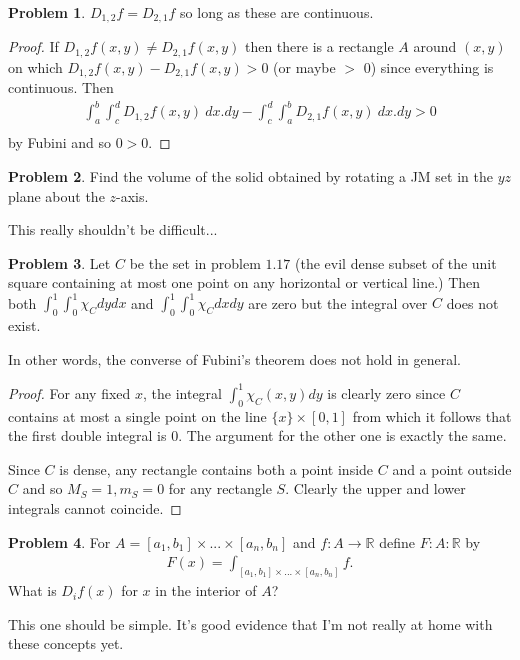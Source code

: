 \documentclass[20pt]{article}
\theoremstyle{plain}
\theoremstyle{definition}
\newtheorem*{problem}{Problem}
\newcommand{\reals}{\mathbb{R}}
\begin{document}
\begin{problem}{3.28}
  $D_{1, 2}f = D_{2, 1}f$ so long as these are continuous.
\end{problem}
\begin{proof}
	If $D_{1, 2}f(x, y) \neq D_{2, 1}f(x, y)$ then there is a rectangle 
	$A$ around $(x, y)$ on which $D_{1, 2}f(x, y) - D_{2, 1}f(x, y) > 0$ (or maybe $>$ 0)
	since everything is continuous.  Then 
	\begin{align*}
		\int_a^b \int_c^d D_{1, 2} f(x, y)\ dx.dy - \int_c^d \int_a^b D_{2, 1} f(x, y)\ dx.dy > 0 \\
	\end{align*}
	by Fubini and so $0 > 0$.
\end{proof}




\begin{problem}{3.29}
  Find the volume of the solid obtained by rotating a 
  JM set in the $yz$ plane about the $z$-axis.
\end{problem}
\color{Blue}
This really shouldn't be difficult...
\color{Black}





\begin{problem}{3.30}
  Let $C$ be the set in problem $1.17$ (the evil dense subset of the unit square 
  containing at most one point on any horizontal or vertical line.)
  Then both $\int_0^1 \int_0^1 \chi_C dydx$ and  $\int_0^1 \int_0^1 \chi_C dxdy$
  are zero but the integral over $C$ does not exist.

  In other words, the converse of Fubini's theorem does not hold in general.
\end{problem}

\begin{proof}
  For any fixed $x$, the integral $\int_0^1\chi_C(x, y)dy$ is clearly zero since
  $C$ contains at most a single point on the line $\{x\} \times [0,1]$ from which
  it follows that the first double integral is $0$.  The argument for the other one
  is exactly the same.

  Since $C$ is dense, any rectangle contains both a point inside $C$ and
  a point outside $C$ and so $M_S = 1, m_S = 0$ for any rectangle $S$.
  Clearly the upper and lower integrals cannot coincide.
\end{proof}


\begin{problem}{3.31}
  For $A = [a_1, b_1] \times ...\times [a_n, b_n]$ and $f: A \to \reals$
  define $F: A: \reals$ by
  \begin{align*}
    F(x) = \int_{[a_1, b_1]\times ... \times[a_n, b_n]}f.
  \end{align*}
  What is $D_if(x)$ for $x$ in the interior of $A$?
\end{problem}
\color{Blue}
This one should be simple. It's good evidence that I'm not really at home with these concepts yet.
\color{Black}
\end{document}
